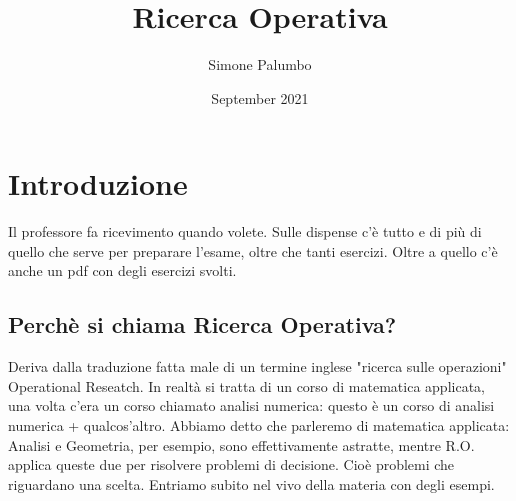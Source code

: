 \documentclass{article}
\title{Ricerca Operativa}
\author{Simone Palumbo}
\date{September 2021}
\begin{document}
\maketitle

\newpage

\section{Introduzione}
Il professore fa ricevimento quando volete. Sulle dispense c'è tutto e di più di quello che serve per preparare l'esame, oltre che tanti esercizi. Oltre a quello c'è anche un pdf con degli esercizi svolti.

\subsection{Perchè si chiama Ricerca Operativa?} 
Deriva dalla traduzione fatta male di un termine inglese "ricerca sulle operazioni" Operational Reseatch. In realtà si tratta di un corso di matematica applicata, una volta c'era un corso chiamato analisi numerica: questo è un corso di analisi numerica + qualcos'altro. Abbiamo detto che parleremo di matematica applicata: Analisi e Geometria, per esempio, sono effettivamente astratte, mentre R.O. applica queste due per risolvere problemi di decisione. Cioè problemi che riguardano una scelta. Entriamo subito nel vivo della materia con degli esempi.
\end{document}
